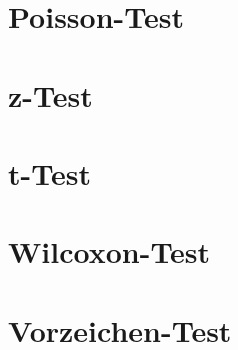 \section{Poisson-Test}
\section{z-Test}
\section{t-Test}
\section{Wilcoxon-Test}
\section{Vorzeichen-Test}
